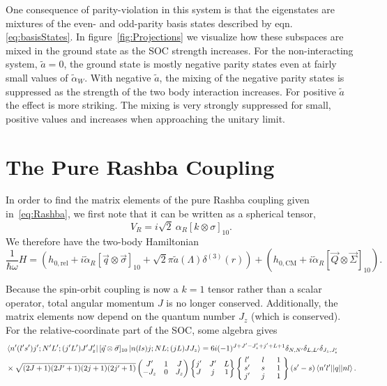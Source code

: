 \documentclass[%
 notitlepage,
 preprint,
showpacs,%
 amsmath,amssymb,
 aps,
pra,
]{revtex4-1}
\newcommand{\threej}[6]{ \begin{pmatrix}
  #1 & #2 & #3 \\
  #4 & #5 & #6 
 \end{pmatrix}}
\newcommand{\sixj}[6]{ \begin{Bmatrix}
  #1 & #2 & #3 \\
  #4 & #5 & #6 
 \end{Bmatrix}}
\newcommand{\ninej}[9]{ \begin{Bmatrix}
  #1 & #2 & #3 \\
  #4 & #5 & #6 \\
  #7 & #8 & #9
 \end{Bmatrix}}
\begin{document}
\color{red}
One consequence of parity-violation in this system is that the eigenstates are mixtures of the even- and odd-parity basis states described by eqn. \eqref{eq:basisStates}. In figure~\ref{fig:Projections} we visualize how these subspaces are mixed in the ground state as the SOC strength increases. For the non-interacting system, $\tilde{a}=0$, the ground state is mostly negative parity states even at fairly small values of $\tilde{\alpha}_W$. With negative $\tilde{a}$, the mixing of the negative parity states is suppressed as the strength of the two body interaction increases. For positive $\tilde{a}$ the effect is more striking. The mixing is very strongly suppressed for small, positive values and increases when approaching the unitary limit.
\color{black}

\section{\label{sec:Rashba}The Pure Rashba Coupling}

In order to find the matrix elements of the pure Rashba coupling given in~\eqref{eq:Rashba}, we first note that it can be written as a spherical tensor,
\begin{equation}
V_{R}=i\sqrt{2}\:\alpha_R \left[ k \otimes \sigma \right]_{10}.
\end{equation}
We therefore have the two-body Hamiltonian
\begin{equation}\label{eq:RashbaHamiltonian}
\frac{1}{\hbar\omega}H=\left(h_{0,\text{rel}}+i \tilde{\alpha}_R  \left[ \vec{q} \otimes \vec{\sigma} \right]_{10} + \sqrt{2}\pi \tilde{a}(\Lambda) \delta^{(3)}(r)\right)+\left(h_{0,\text{CM}}+i \tilde{\alpha}_R [ \vec{Q}\otimes \vec{\Sigma} ]_{10} \right).
\end{equation}

Because the spin-orbit coupling is now a $k=1$ tensor rather than a scalar operator, total angular momentum $J$ is no longer conserved. Additionally, the matrix elements now depend on the quantum number $J_z$ (which is conserved). For the relative-coordinate part of the SOC, some algebra gives
\begin{equation}\begin{split}
&\bra{n'(l's')j';N'L';(j'L')J'J'_z}  [ \vec{q} \otimes \vec{\sigma} ]_{10}  \ket{n(ls)j;NL;(jL)JJ_z} =6 i (-1)^{J+J'-J'_z+j'+L+1}\delta_{N,N'}\delta_{L,L'}\delta_{J_z,J'_z} \\
 &\times\sqrt{(2J+1)(2J'+1)(2j+1)(2j'+1)} \threej{J'}{1}{J}{-J_z}{0}{J_z} \sixj{j'}{J'}{L}{J}{j}{1}
 \renewcommand{\arraystretch}{0.9}
 \ninej{\hphantom{l}l'\hphantom{l}}{\hphantom{l}l\hphantom{l}}{\hphantom{l}1\hphantom{l}}{s'}{s}{1}{j'}{j}{1} (s'-s) \braket{n'l' || q || n l}.
\end{split}
\end{equation}
\end{document}
